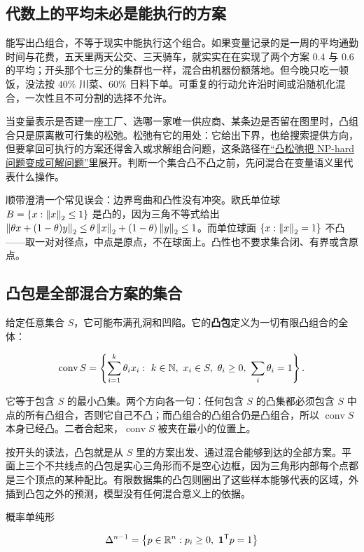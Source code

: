 \subsection{代数上的平均未必是能执行的方案}

能写出凸组合，不等于现实中能执行这个组合。如果变量记录的是一周的平均通勤时间与花费，五天里两天公交、三天骑车，就实实在在实现了两个方案 \(0.4\) 与 \(0.6\) 的平均；开头那个七三分的集群也一样，混合由机器份额落地。但今晚只吃一顿饭，没法按 \(40\%\) 川菜、\(60\%\) 日料下单。可重复的行动允许沿时间或沿随机化混合，一次性且不可分割的选择不允许。

当变量表示是否建一座工厂、选哪一家唯一供应商、某条边是否留在图里时，凸组合只是原离散可行集的松弛。松弛有它的用处：它给出下界，也给搜索提供方向，但要拿回可执行的方案还得舍入或求解组合问题，这条路径在\hyperref[sec:09-Convex-Optimization/09-Complexity-and-Approximation/02]{``凸松弛把 NP-hard 问题变成可解问题''}里展开。判断一个集合凸不凸之前，先问混合在变量语义里代表什么操作。

顺带澄清一个常见误会：边界弯曲和凸性没有冲突。欧氏单位球 \(B=\left\{x:\left\lVert x\right\rVert_2\le1\right\}\) 是凸的，因为三角不等式给出 \(\left\lVert\theta x+(1-\theta)y\right\rVert_2\le\theta\left\lVert x\right\rVert_2+(1-\theta)\left\lVert y\right\rVert_2\le1\)。而单位球面 \(\left\{x:\left\lVert x\right\rVert_2=1\right\}\) 不凸——取一对对径点，中点是原点，不在球面上。凸性也不要求集合闭、有界或含原点。

\subsection{凸包是全部混合方案的集合}

给定任意集合 \(S\)，它可能布满孔洞和凹陷。它的\textbf{凸包}定义为一切有限凸组合的全体：

\[
\operatorname{conv}S = \left\{
\sum_{i=1}^k\theta_i x_i:\ k\in\N,\ x_i\in S,\ \theta_i\ge0,\ \sum_i\theta_i=1
\right\}.
\]

它等于包含 \(S\) 的最小凸集。两个方向各一句：任何包含 \(S\) 的凸集都必须包含 \(S\) 中点的所有凸组合，否则它自己不凸；而凸组合的凸组合仍是凸组合，所以 \(\operatorname{conv}S\) 本身已经凸。二者合起来，\(\operatorname{conv}S\) 被夹在最小的位置上。

按开头的读法，凸包就是从 \(S\) 里的方案出发、通过混合能够到达的全部方案。平面上三个不共线点的凸包是实心三角形而不是空心边框，因为三角形内部每个点都是三个顶点的某种配比。有限数据集的凸包则圈出了这些样本能够代表的区域，外插到凸包之外的预测，模型没有任何混合意义上的依据。

概率单纯形

\[
\Delta^{n-1} = \set{p\in\R^n:p_i\ge0,\ \ind^{\trans}p=1}
\]

